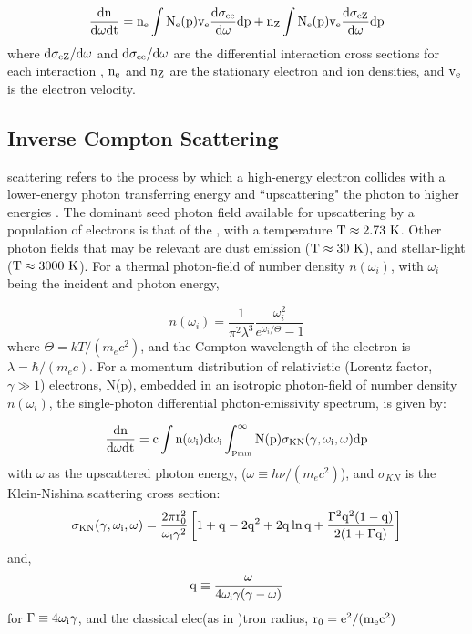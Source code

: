 \begin{equation}
{\rm \frac{d n}{d \omega d t} =
	n_e \int
	N_e(p) v_e
	\frac{d \sigma_{e e}}{d \omega}dp +
	n_Z \int
	N_e(p) v_e
	\frac{d \sigma_{e Z}}{d \omega}dp}
\end{equation}
where ${\rm d \sigma_{e Z}/d \omega}$ and ${\rm d \sigma_{e e}/d \omega}$ are the differential interaction cross sections for each interaction \citep{Koch59,Haug75}, ${\rm n_e}$ and ${\rm n_Z}$ are the stationary electron and ion densities, and ${\rm v_e}$ is the electron velocity.

\subsection{Inverse Compton Scattering}\label{gamAstr:IC}

\ic{} scattering refers to the process by which a high-energy electron collides with a lower-energy photon transferring energy and ``upscattering" the photon to higher energies \citep{Blumenthal70}. The dominant seed photon field available for upscattering by a population of electrons is that of the \cmb{}, with a temperature ${\rm T \approx 2.73~K}$. Other photon fields that may be relevant are \fir{} dust emission (${\rm T \approx 30~K}$), and \nir{} stellar-light (${\rm T \approx 3000~K}$). For a thermal photon-field of number density $n(\omega_i)$, with $\omega_i$ being the incident and photon energy,

\begin{equation}
n(\omega_i) = 
\frac{1}{\pi^2\lambda^3} 
\frac{\omega_i^2}{e^{\omega_i/\Theta} -1}
\end{equation}
where  $\Theta=kT/(m_e c^2)$, and the Compton wavelength of the electron is $\lambda=\hbar/(m_e c)$.
For a momentum distribution of relativistic (Lorentz factor, $\gamma \gg 1$) electrons, N(p), embedded in an isotropic photon-field of number density $n(\omega_i)$, the single-photon differential photon-emissivity spectrum,  is given by:

\begin{equation}
{\rm \frac{dn}{d\omega dt} = 
c \int  n(\omega_i)d \omega_i
\int_{p_{min}}^\infty 
N(p)  \sigma_{KN}(\gamma,\omega_i,\omega)dp}
\end{equation}
with $\omega$ as the upscattered photon energy, ($\omega\equiv h\nu/(m_e c^2)$), and $\sigma_{KN}$ is the Klein-Nishina scattering  cross section:
\begin{equation}
{\rm \sigma_{KN}(\gamma,\omega_i,\omega) = \frac{2\pi r_0^2}{\omega_i \gamma^2}
\left[
1 + q - 2q^2 + 2q\ln q + \frac{\Gamma^2 q^2 (1-q)}{2(1+\Gamma q)}
\right]}
\end{equation}
and,
\begin{equation}
{\rm q \equiv \frac{\omega}{4 \omega_i \gamma (\gamma-\omega)}}
\end{equation}
for ${\rm \Gamma \equiv 4\omega_i \gamma}$, and the classical elec(as in \cite{Houck06})tron radius, ${\rm r_0 = e^2/(m_e c^2)}$

